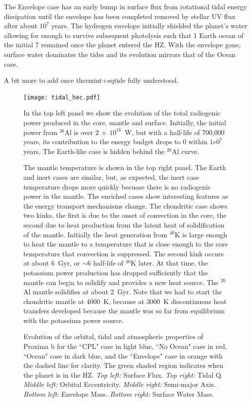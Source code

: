 \documentclass[preprint,12pt]{aastex}
\newcommand{\xxx}[1]{{\color{red} #1}} %
\begin{document}
The Envelope case has an early bump in surface flux from rotational tidal energy dissipation until the envelope has been completed removed by stellar UV flux 
after about $10^7$ years.  The hydrogen envelope initially shielded the planet's water allowing for enough to survive subsequent photolysis such that 1 Earth 
ocean of the initial 7 remained once the planet entered the HZ.  With the envelope gone, surface water dominates the tides and its evolution mirrors that of the 
Ocean case.

\xxx{A bit more to add once thermint+eqtide fully understood.}

\begin{figure} 
\begin{center}
\texttt{[image: tidal\_hec.pdf]}
\end{center}
\caption{Evolution of the orbital, tidal and atmospheric properties of Proxima b for the ``CPL" case in light blue, ``No Ocean" case in red, ``Ocean" case in dark blue, and the ``Envelope" case in orange with the dashed line for clarity.  The green shaded region indicates when the planet is in the HZ. {\it Top left:} Surface Flux. {\it Top right:} Tidal Q. {\it Middle left:} Orbital Eccentricity. {\it Middle right:} Semi-major Axis. {\it Bottom left:} Envelope Mass. {\it Bottom right:} Surface Water Mass.}
\label{fig:tidal_hec}

In the top left panel we show the evolution of the total radiogenic
power produced in the core, mantle and surface. Initially, the initial
power from $^{26}$Al is over $2~\times~10^{18}$~W, but with a
half-life of 700,000 years, its contribution to the energy budget
drops to 0 within $1e0^7$ years. The Earth-like case is hidden behind
the $^{26}$Al curve.

The mantle temperature is shown in the top right panel. The Earth and
inert cases are similar, but, as expected, the inert case temperature
drops more quickly becuase there is no radiogenic power in the
mantle. The enriched cases show interesting features as the energy
transport mechanisms change. The chondritic case shows two kinks, the
first is due to the onset of convection in the core, the second due to
heat production from the latent heat of solidification of the
mantle. Initially the heat generation from $^{40}$K is large enough to
heat the mantle to a temperature that is close enough to the core
temperature that convection is suppressed. The second kink occurs at
about 6~Gyr, or $\sim$6 half-life of $^{40}$K later. At that time, the
potassium power production has dropped sufficiently that the mantle
can begin to solidify and provides a new heat source. The $^{26}$Al
mantle solidifies at about 2~Gyr. Note that we had to start the
chondritic mantle at 4000~K, because at 3000~K discontinuous heat
transfers developed because the mantle was so far from equilibrium
with the potassium power source.


\end{figure}
\end{document}
